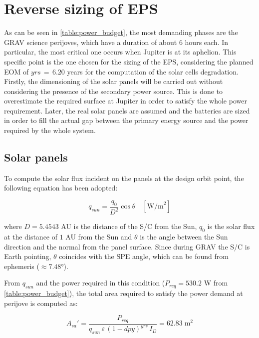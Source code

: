 \section{Reverse sizing of EPS}
\label{sec:EPS_sizing}

As can be seen in \autoref{table:power_budget}, the most demanding phases are the GRAV science perijoves, which have a duration of about 6 hours each. In particular, the most critical one occurs when Jupiter is at its aphelion.
This specific point is the one chosen for the sizing of the EPS, considering the planned EOM of $yrs \, = \, 6.20$ years for the computation of the solar cells degradation.
Firstly, the dimensioning of the solar panels will be carried out without considering the presence of the secondary power source.
This is done to overestimate the required surface at Jupiter in order to satisfy the whole power requirement.
Later, the real solar panels are assumed and the batteries are sized in order to fill the actual gap between the primary energy source and the power required by the whole system. 

\vspace{-1mm}

\subsection{Solar panels}
\label{subsec:solar_panels_sizing}

To compute the solar flux incident on the panels at the design orbit point, the following equation has been adopted:

\begin{equation}
    q_{sun} = \frac{q_0}{D^2} \cos \theta \quad [ \textrm{W/m}^2 ]
\end{equation}

where $D = 5.4543$ AU is the distance of the S/C from the Sun, $q_0$ is the solar flux at the distance of $1$ AU from the Sun and $\theta$ is the angle between the Sun direction and the normal from the panel surface.
Since during GRAV the S/C is Earth pointing, $\theta$ coincides with the SPE angle, which can be found from ephemeris ($\approx 7.48$°).

From $q_{sun}$ and the power required in this condition ($P_{req} = 530.2$ W from \autoref{table:power_budget}), the total area required to satisfy the power demand at perijove is computed as:

\begin{equation}
    A_{sa}' = \frac{P_{req}}{q_{sun} \, \varepsilon \, \left( 1 - dpy \right) ^ {yrs} \, I_D} = 62.83 \; \textrm{m}^2
    \label{eq:A_sa}
\end{equation}


